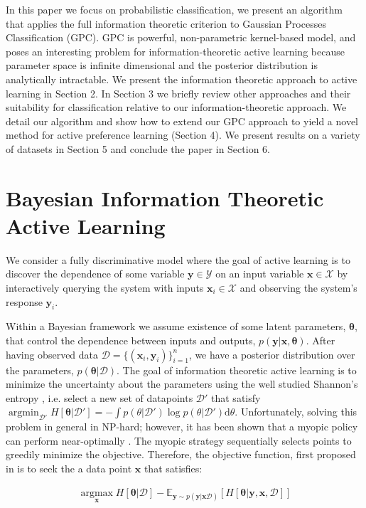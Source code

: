 \documentclass{article}
\newcommand{\x}{\bm{x}}
\newcommand{\y}{\bm{y}}
\newcommand{\data}{\mathcal{D}}
\newcommand{\param}{\bm{\theta}}
\newcommand{\argmax}{ \operatorname*{arg \max}}
\newcommand{\argmin}{ \operatorname*{arg \min}}
\newcommand{\E}{\mathbb{E}}
\begin{document}
In this paper we focus on probabilistic classification, we present an algorithm that applies the full information theoretic criterion to Gaussian Processes Classification (GPC). GPC is powerful, non-parametric kernel-based model, and poses an interesting problem for information-theoretic active learning because parameter space is infinite dimensional and the posterior distribution is analytically intractable. We present the information theoretic approach to active learning in Section 2. In Section 3 we briefly review other approaches and their suitability for classification relative to our information-theoretic approach. We detail our algorithm and show how to extend our GPC approach to yield a novel method for active preference learning (Section 4). We present results on a variety of datasets in Section 5 and conclude the paper in Section 6.

\section{Bayesian Information Theoretic Active Learning}

We consider a fully discriminative model where the goal of active learning is to discover the dependence of some variable $\y\in\mathcal{Y}$ on an input variable $\x\in\mathcal{X}$ by interactively querying the system with inputs $\x_i\in\mathcal{X}$ and observing the system's response $\y_i$. 

Within a Bayesian framework we assume existence of some latent parameters, $\param$, that control the dependence between inputs and outputs, $p(\y\vert\x,\param)$. After having observed data $\data = \{(\x_i,\y_i)\}_{i=1}^n$, we have a posterior distribution over the parameters, $p(\param|\data)$. The goal of information theoretic active learning is to minimize the uncertainty about the parameters using the well studied Shannon's entropy \cite{coverandthomas}, i.e. select a new set of datapoints $\mathcal{D}'$ that satisfy $\argmin_{\mathcal{D}'}H[\param|\mathcal{D}']=-\int p(\theta|\mathcal{D}')\log p(\theta|\mathcal{D}') \mathrm{d}\theta$. Unfortunately, solving this problem in general in NP-hard; however, it has been shown that a myopic policy can perform near-optimally \cite{golovin2010,dasgupta2005}. The myopic strategy sequentially selects points to greedily minimize the objective. Therefore, the objective function, first proposed in \cite{lindley1956} is to seek the a data point $\x$ that satisfies:

\begin{align}	
	\label{eqn:ent_change}
	\argmax_{\x} H[\param | \data] - \E_{\y\sim p(\y|\x\data)} \left[ H[\param| \y, \x,\data] \right] 
\end{align}
\end{document}
